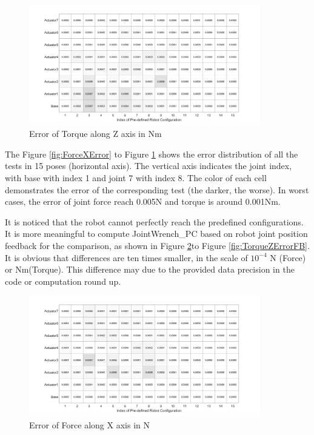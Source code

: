 \begin{figure}[H]
	\begin{center}
		\includegraphics[width=0.9\textwidth]{./images/TorqueZError.png}%
		\caption{Error of Torque along Z axis in Nm}
		\label{fig:TorqueZError}%
	\end{center}
\end{figure}

The Figure \ref{fig:ForceXError} to Figure \ref{fig:TorqueZError} shows the error distribution of all the tests in 15 poses (horizontal axis). The vertical axis indicates the joint index, with base with index 1 and joint 7 with index 8. The color of each cell demonstrates the error of the corresponding test (the darker, the worse). In worst cases, the error of joint force reach 0.005N and torque is around 0.001Nm. 

It is noticed that the robot cannot perfectly reach the predefined configurations. It is more meaningful to compute JointWrench\_PC based on robot joint position feedback for the comparison, as shown in Figure \ref{fig:ForceXErrorFB}to Figure \ref{fig:TorqueZErrorFB}. It is obvious that differences are ten times smaller, in the scale of $10^{-4}$ N (Force) or Nm(Torque). This difference may due to the provided data precision in the code or computation round up. 


\begin{figure}[H]
	\begin{center}
		\includegraphics[width=0.9\textwidth]{./images/ForceXErrorFB.png}%
		\caption{Error of Force along X axis in N}
		\label{fig:ForceXErrorFB}%
	\end{center}
\end{figure}

